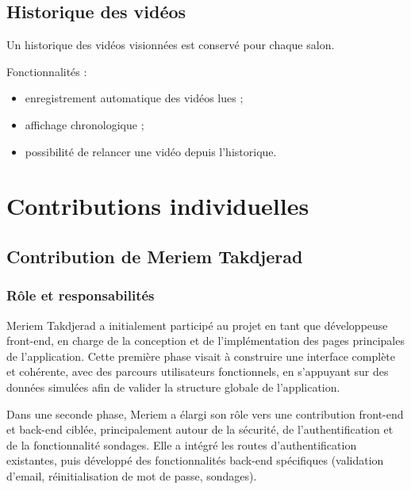 \documentclass[12pt,a4paper]{report}
\begin{document}
\section{Historique des vidéos}

Un historique des vidéos visionnées est conservé pour chaque salon.

Fonctionnalités :
\begin{itemize}
  \item enregistrement automatique des vidéos lues ;
  \item affichage chronologique ;
  \item possibilité de relancer une vidéo depuis l’historique.
\end{itemize}
\chapter{Contributions individuelles}

\section{Contribution de Meriem Takdjerad}

\subsection*{Rôle et responsabilités}

Meriem Takdjerad a initialement participé au projet en tant que développeuse front-end, en charge de la conception et de l’implémentation des pages principales de l’application. Cette première phase visait à construire une interface complète et cohérente, avec des parcours utilisateurs fonctionnels, en s’appuyant sur des données simulées afin de valider la structure globale de l’application.

Dans une seconde phase, Meriem a élargi son rôle vers une contribution front-end et back-end ciblée, principalement autour de la sécurité, de l’authentification et de la fonctionnalité sondages. Elle a intégré les routes d’authentification existantes, puis développé des fonctionnalités back-end spécifiques (validation d’email, réinitialisation de mot de passe, sondages).
\end{document}
